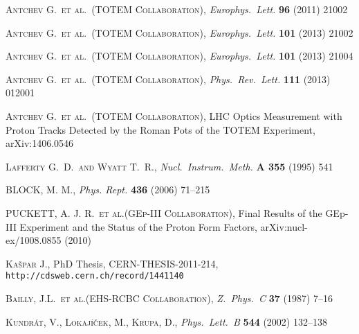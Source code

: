 \documentclass[3p,onecolumn,12pt,times,longtitle]{elsarticle}
\def\etal{et al.}
\def\Name#1{\textsc{#1}, }
\def\REVIEW#1#2#3#4{{\it #1} {\bf #2} (#3) #4}
\begin{document}
\begin{thebibliography}{99}
	\Name{Antchev G.~\etal{}~(TOTEM Collaboration)}
	\REVIEW{Europhys.~Lett.}{96}{2011}{21002}

	\Name{Antchev G.~\etal{}~(TOTEM Collaboration)}
	\REVIEW{Europhys.~Lett.}{101}{2013}{21002}


	\Name{Antchev G.~\etal{}~(TOTEM Collaboration)}
	\REVIEW{Europhys.~Lett.}{101}{2013}{21004}

	\Name{Antchev G.~\etal{}~(TOTEM Collaboration)}
	\REVIEW{Phys.~Rev.~Lett.}{111}{2013}{012001}


	\Name{Antchev G.~\etal{}~(TOTEM Collaboration)}
	LHC Optics Measurement with Proton Tracks Detected by the Roman Pots of the TOTEM Experiment, 
	arXiv:1406.0546

	\Name{Lafferty G.~D.~and Wyatt T.~R.}
	\REVIEW{Nucl.\ Instrum.\ Meth.}{A 355}{1995}{541}


	\Name{BLOCK, M. M.}
	\REVIEW{Phys. Rept.}{436}{2006}{71--215}

	\Name{PUCKETT, A. J. R.~\etal{}(GEp-III Collaboration)}
	Final Results of the GEp-III Experiment and the Status of the Proton Form Factors,
	arXiv:nucl-ex/1008.0855 (2010)

	\Name{Ka\v spar J.}
	PhD Thesis, CERN-THESIS-2011-214, {\tt http://cdsweb.cern.ch/record/1441140}

	\Name{Bailly, J.L.~\etal{}(EHS-RCBC Collaboration)}
	\REVIEW{Z.~Phys.~C}{37}{1987}{7--16}

	\Name{Kundr\' at, V., Lokaj\' i\v cek, M., Krupa, D.}
	\REVIEW{Phys.~Lett.~B}{544}{2002}{132--138}


\end{thebibliography}
\end{document}
